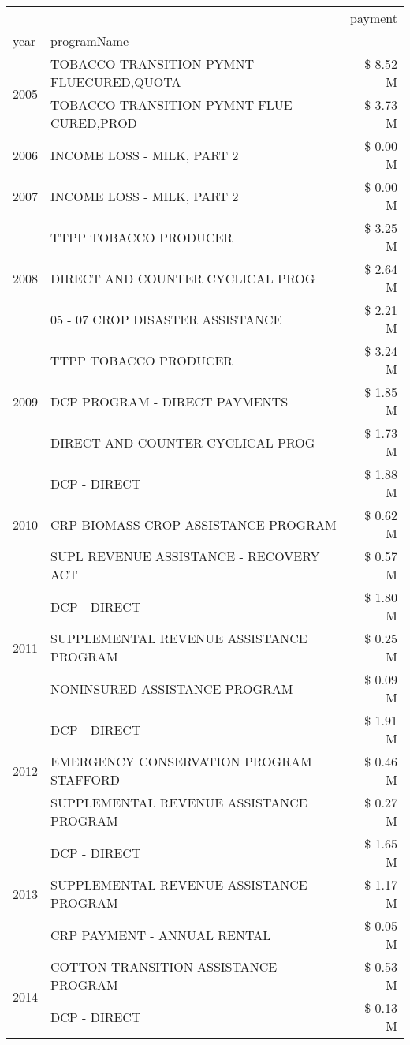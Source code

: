 \begin{tabular}{llr}
\toprule
 &  & payment \\
year & programName &  \\
\midrule
\multirow[t]{2}{*}{2005} & TOBACCO TRANSITION PYMNT-FLUECURED,QUOTA & \$ 8.52 M \\
 & TOBACCO TRANSITION PYMNT-FLUE CURED,PROD & \$ 3.73 M \\
\cline{1-3}
2006 & INCOME LOSS - MILK, PART 2 & \$ 0.00 M \\
\cline{1-3}
2007 & INCOME LOSS - MILK, PART 2 & \$ 0.00 M \\
\cline{1-3}
\multirow[t]{3}{*}{2008} & TTPP TOBACCO PRODUCER & \$ 3.25 M \\
 & DIRECT AND COUNTER CYCLICAL PROG & \$ 2.64 M \\
 & 05 - 07 CROP DISASTER ASSISTANCE & \$ 2.21 M \\
\cline{1-3}
\multirow[t]{3}{*}{2009} & TTPP TOBACCO PRODUCER & \$ 3.24 M \\
 & DCP PROGRAM - DIRECT PAYMENTS & \$ 1.85 M \\
 & DIRECT AND COUNTER CYCLICAL PROG & \$ 1.73 M \\
\cline{1-3}
\multirow[t]{3}{*}{2010} & DCP - DIRECT & \$ 1.88 M \\
 & CRP BIOMASS CROP ASSISTANCE PROGRAM & \$ 0.62 M \\
 & SUPL REVENUE ASSISTANCE - RECOVERY ACT & \$ 0.57 M \\
\cline{1-3}
\multirow[t]{3}{*}{2011} & DCP - DIRECT & \$ 1.80 M \\
 & SUPPLEMENTAL REVENUE ASSISTANCE PROGRAM & \$ 0.25 M \\
 & NONINSURED ASSISTANCE PROGRAM & \$ 0.09 M \\
\cline{1-3}
\multirow[t]{3}{*}{2012} & DCP - DIRECT & \$ 1.91 M \\
 & EMERGENCY CONSERVATION PROGRAM STAFFORD & \$ 0.46 M \\
 & SUPPLEMENTAL REVENUE ASSISTANCE PROGRAM & \$ 0.27 M \\
\cline{1-3}
\multirow[t]{3}{*}{2013} & DCP - DIRECT & \$ 1.65 M \\
 & SUPPLEMENTAL REVENUE ASSISTANCE PROGRAM & \$ 1.17 M \\
 & CRP PAYMENT - ANNUAL RENTAL & \$ 0.05 M \\
\cline{1-3}
\multirow[t]{3}{*}{2014} & COTTON TRANSITION ASSISTANCE PROGRAM & \$ 0.53 M \\
 & DCP - DIRECT & \$ 0.13 M \\

\end{tabular}
